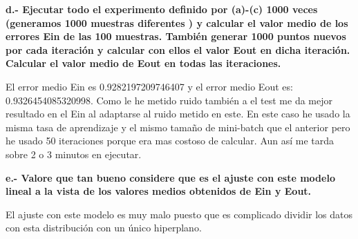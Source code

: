 \documentclass[titlepage]{article}
\begin{document}
 	\textbf{d.- Ejecutar todo el experimento definido por (a)-(c) 1000 veces (generamos 1000 muestras diferentes ) y calcular el valor medio de los errores  Ein de las 100 muestras. También generar 1000 puntos nuevos por cada iteración y calcular con ellos el valor Eout en dicha iteración. Calcular el valor medio de Eout en todas las iteraciones.}
 	\newline
 	
 	
 	El error medio Ein es 0.9282197209746407 y el error medio Eout es:  0.9326454085320998. Como le he metido ruido también a el test me da mejor resultado en el Ein al adaptarse al ruido metido en este.
 	En este caso he usado la misma tasa de aprendizaje y el mismo tamaño de mini-batch que el anterior pero he usado 50 iteraciones porque era mas costoso de calcular. Aun así me tarda sobre 2 o 3 minutos en ejecutar. 
 	\newline
 	
 	
 		
 	
 \newpage
 
 \newpage
	 \textbf{e.- Valore que tan bueno considere que es el ajuste con este modelo lineal a la vista de los valores medios obtenidos de Ein y Eout.}
	 \newline
	 
	 El ajuste con este modelo es muy malo puesto que es complicado dividir los datos con esta distribución con un único hiperplano. 
 \newpage
  
\end{document}
